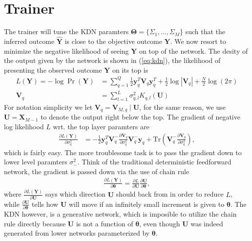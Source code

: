 \documentclass[11pt]{article}
\newcommand{\bs}{\boldsymbol}
\newcommand{\trb}[1]{\textrm{Tr}\left({#1}\right)}
\newcommand{\vy}{\boldsymbol{y}}
\newcommand{\xv}{\boldsymbol{V}}
\newcommand{\xx}{\boldsymbol{X}}
\newcommand{\xu}{\boldsymbol{U}}
\newcommand{\xy}{\boldsymbol{Y}}
\newcommand{\xyh}{\hat{\xy}}
\newcommand{\PDV}[2]{\frac{\partial #1}{\partial #2}}
\begin{document}
\section{Trainer}
The trainer will tune the KDN paramters $\bs{\Theta} = \{\Sigma_1, \dots, \Sigma_M \}$ such that the inferred outcome $\xyh$ is close to the objective outcome $\xy$. We now resort to minimize the negative likelihood of seeing $\xy$ on top of the network. The desity of the output given by the network is shown in (\ref{eq:kdn}), the likelihood of presenting the observed outcome $\xy$ on its top is
\begin{equation}\label{eq:lky}
  \begin{split}
    L(\xy) = -\log\Pr(\xy) &= \sum_{q=1}^Q \frac{1}{2} \vy_q^T \xv_q \vy_q^T + \frac{1}{2}\log\left|\xv_q\right| + \frac{N}{2}\log(2\pi) \\
    \xv_q &= \sum_{l=1}^L \sigma^2_{q,l}K_{q,l}(\xu)
  \end{split}
\end{equation}
For notation simplicity we let $\xv_q = \xv_{M,q}\mid\xu$, for the same reason, we use $\xu = \xx_{M-1}$ to denote the output right below the top. The gradient of negative log likelihood $L$ wrt. the top layer paramters are
\begin{equation}
  \begin{split}
    \PDV{L(\xy)}{\sigma^2_q} & = -\frac{1}{2} \vy_q^T\xv_q^- \PDV{\xv_q}{\sigma^2_q} \xv_q^-\vy_q + \trb{\xv_q^-\PDV{\xv_q}{\sigma^2_q}},
  \end{split}
\end{equation}
which is fairly easy. The more troublesome task is to pass the gradient down to lower level paramters $\sigma^2_-$. Think of the traditional deterministic feedforward network, the gradient is passed down via the use of chain rule
\begin{equation}
\begin{split}
  \PDV{L(\xy)}{\bs{\theta}} = \PDV{L}{\xu} \PDV{\xu}{\bs{\theta}},
\end{split}
\end{equation}
where $\PDV{L(\xy)}{\xu}$ says which direction $\xu$ should back from in order to reduce $L$, while $\PDV{\xu}{\bs{\theta}}$ tells how $\xu$ will move if an infinitely small increment is given to $\bs{\theta}$. The KDN however, is a generative network, which is imposible to utilize the chain rule directly because $\xu$ is not a function of $\bs{\theta}$, even though $\xu$ was indeed generated from lower networks parameterized by $\bs{\theta}$.
\end{document}
